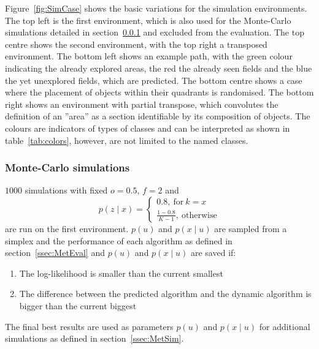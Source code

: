 \documentclass[twocolumn,letterpaper]{IEEEAerospaceCLS}  %
\begin{document}
Figure~\ref{fig:SimCase} shows the basic variations for the simulation environments. The top left is the first environment, which is also used for the Monte-Carlo simulations detailed in section~\ref{ssec:MetMC} and excluded from the evaluation. The top centre shows the second environment, with the top right a transposed environment. The bottom left shows an example path, with the green colour indicating the already explored areas, the red the already seen fields and the blue the yet unexplored fields, which are predicted. The bottom centre shows a case where the placement of objects within their quadrants is randomised. The bottom right shows an environment with partial transpose, which convolutes the definition of an ''area'' as a section identifiable by its composition of objects. The colours are indicators of types of classes and can be interpreted as shown in table~\ref{tab:colors}, however, are not limited to the named classes.
\subsubsection{Monte-Carlo simulations} \label{ssec:MetMC}
$1000$ simulations with fixed $o=0.5$, $f=2$ and
\begin{equation} \nonumber
    p(z\mid x)=
    \begin{cases}
        0.8,~\text{for}~k=x \\
        \frac{1-0.8}{K-1},~\text{otherwise}
    \end{cases}
\end{equation}
are run on the first environment. $p(u)$ and $p(x\mid u)$ are sampled from a simplex and the performance of each algorithm as defined in section~\ref{ssec:MetEval} and $p(u)$ and $p(x\mid u)$ are saved if:
\begin{enumerate}
    \item The log-likelihood is smaller than the current smallest
    \item The difference between the predicted algorithm and the dynamic algorithm is bigger than the current biggest
\end{enumerate}
The final best results are used as parameters $p(u)$ and $p(x\mid u)$ for additional simulations as defined in section~\ref{ssec:MetSim}.
\end{document}
